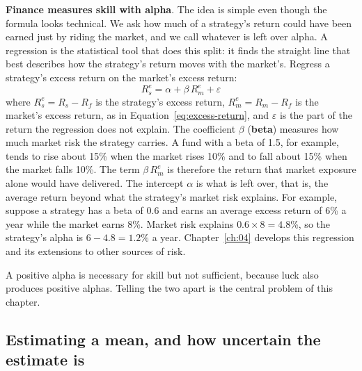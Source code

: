 \textbf{Finance measures skill with alpha}. The idea is simple even though the formula looks technical. We ask how much of a strategy's return could have been earned just by riding the market, and we call whatever is left over alpha. A regression is the statistical tool that does this split: it finds the straight line that best describes how the strategy's return moves with the market's. Regress a strategy's excess return on the market's excess return:
\begin{equation}
  R^{e}_{s} = \alpha + \beta\, R^{e}_{m} + \varepsilon \nonumber
\label{eq:ch01_beta}
\end{equation}
where $R^{e}_{s} = R_s - R_f$ is the strategy's excess return, $R^{e}_{m} = R_m - R_f$ is the market's excess return, as in Equation~\eqref{eq:excess-return}, and $\varepsilon$ is the part of the return the regression does not explain. The coefficient $\beta$ (\textbf{beta}) measures how much market risk the strategy carries. A fund with a beta of 1.5, for example, tends to rise about 15\% when the market rises 10\% and to fall about 15\% when the market falls 10\%. The term $\beta\, R^{e}_{m}$ is therefore the return that market exposure alone would have delivered. The intercept $\alpha$ is what is left over, that is, the average return beyond what the strategy's market risk explains. For example, suppose a strategy has a beta of 0.6 and earns an average excess return of 6\% a year while the market earns 8\%. Market risk explains $0.6 \times 8 = 4.8$\%, so the strategy's alpha is $6 - 4.8 = 1.2$\% a year. Chapter~\ref{ch:04} develops this regression and its extensions to other sources of risk.

A positive alpha is necessary for skill but not sufficient, because luck also produces positive alphas. Telling the two apart is the central problem of this chapter.

\subsection{Estimating a mean, and how uncertain the estimate is}
\label{sec:01-se}

